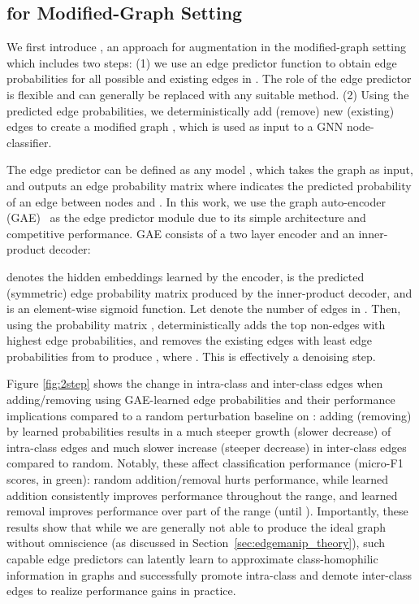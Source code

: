 \documentclass[letterpaper]{article} \usepackage{aaai21}  \usepackage{times}  \usepackage{helvet} \usepackage{courier}  \usepackage[hyphens]{url}  \usepackage{graphicx} \urlstyle{rm} \def\UrlFont{\rm}  \usepackage{natbib}  \usepackage{caption} \frenchspacing  \setlength{\pdfpagewidth}{8.5in}  \setlength{\pdfpageheight}{11in}
\begin{document}
\subsection{\methodtwo for Modified-Graph Setting}
\label{sec:edgemanip_twostep}







We first introduce \methodtwo, an approach for augmentation in the modified-graph setting which includes two steps: (1) we use an edge predictor function to obtain edge probabilities for all possible and existing edges in . The role of the edge predictor is flexible and can generally be replaced with any suitable method. (2) Using the predicted edge probabilities, we deterministically add (remove) new (existing) edges to create a modified graph , which is used as input to a GNN node-classifier.

The edge predictor can be defined as any model , which takes the graph as input, and outputs an edge probability matrix  where  indicates the predicted probability of an edge between nodes  and .  In this work, we use the graph auto-encoder (GAE)~\cite{kipf2016variational} as the edge predictor module due to its simple architecture and competitive performance. GAE consists of a two layer \gcn encoder and an inner-product decoder:

 denotes the hidden embeddings learned by the encoder,  is the predicted (symmetric) edge probability matrix produced by the inner-product decoder, and  is an element-wise sigmoid function.  Let  denote the number of edges in . Then, using the probability matrix , 
\methodtwo deterministically adds the top  non-edges with highest edge probabilities, and removes the  existing edges with least edge probabilities from  to produce , where . This is effectively a denoising step.






Figure \ref{fig:2step} shows the change in intra-class and inter-class edges when adding/removing using GAE-learned edge probabilities and their performance implications compared to a random perturbation baseline on \cora: adding (removing) by learned probabilities results in a much steeper growth (slower decrease) of intra-class edges and much slower increase (steeper decrease) in inter-class edges compared to random.  Notably, these affect classification performance (micro-F1 scores, in green): random addition/removal hurts performance, while learned addition consistently improves performance throughout the range, and learned removal improves performance over part of the range (until ). Importantly, these results show that while we are generally not able to produce the ideal graph  without omniscience (as discussed in Section~\ref{sec:edgemanip_theory}), such capable edge predictors can latently learn to approximate class-homophilic information in graphs and successfully promote intra-class and demote inter-class edges to realize performance gains in practice. 
\end{document}
